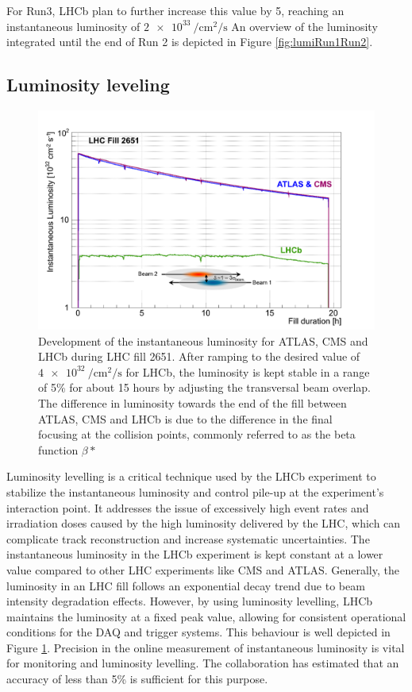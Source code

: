 For Run3, LHCb plan to further increase this value by 5, reaching an instantaneous luminosity of $\SI{2e33}{\per\centi\meter\squared\per\second}$
An overview of the luminosity integrated until the end of Run 2 is depicted in Figure \ref{fig:lumiRun1Run2}.

\subsection{Luminosity leveling}

\begin{figure}
    \centering
    \includegraphics[width=\textwidth]{figures/luminosity_leveling.png}
    \caption{Development of the instantaneous luminosity for ATLAS, CMS and LHCb during LHC fill 2651. After ramping to the desired value of $\SI{4e32}{\per\centi\meter\squared\per\second}$ for LHCb, the luminosity is kept stable in a range of 5\% for about 15 hours by adjusting the transversal beam overlap.
    The difference in luminosity towards the end of the fill between ATLAS, CMS and LHCb is due to the difference in the final focusing at the collision points, commonly referred to as the beta function $\beta*$}
    \label{fig:lumi-leveling}
\end{figure}

Luminosity levelling is a critical technique used by the LHCb experiment to stabilize the instantaneous luminosity and control pile-up at the experiment's interaction point. It addresses the issue of excessively high event rates and irradiation doses caused by the high luminosity delivered by the LHC, which can complicate track reconstruction and increase systematic uncertainties.
The instantaneous luminosity in the LHCb experiment is kept constant at a lower value compared to other LHC experiments like CMS and ATLAS. Generally, the luminosity in an LHC fill follows an exponential decay trend due to beam intensity degradation effects. However, by using luminosity levelling, LHCb maintains the luminosity at a fixed peak value, allowing for consistent operational conditions for the DAQ and trigger systems.  This behaviour is well depicted in Figure \ref{fig:lumi-leveling}. Precision in the online measurement of instantaneous luminosity is vital for monitoring and luminosity levelling. The collaboration has estimated that an accuracy of less than 5\% is sufficient for this purpose. 


